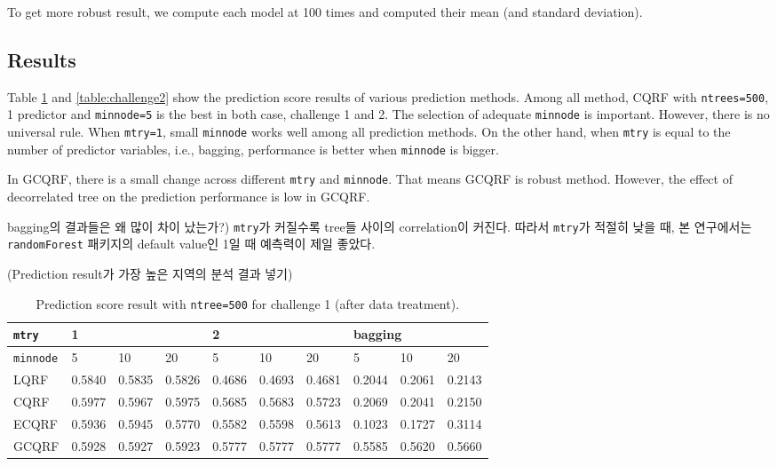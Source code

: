\documentclass[11pt,titlepage]{article}
\begin{document}
	To get more robust result, we compute each model at 100 times and computed their mean (and standard deviation). 

	\subsection{Results}
	Table \ref{table:challenge1} and \ref{table:challenge2} show the prediction score results of various prediction methods. Among all method, CQRF with \texttt{ntrees=500}, 1 predictor and  \texttt{minnode=5} is the best in both case, challenge 1 and 2. The selection of adequate \texttt{minnode} is important. However, there is no universal rule. When \texttt{mtry=1}, small \texttt{minnode} works well among all prediction methods. On the other hand, when \texttt{mtry} is equal to the number of predictor variables, i.e., bagging, performance is better when \texttt{minnode} is bigger.
	
	In GCQRF, there is a small change across different \texttt{mtry} and \texttt{minnode}. That means GCQRF is robust method. However, the effect of decorrelated tree on the prediction performance is low in GCQRF.

	bagging의 결과들은 왜 많이 차이 났는가?) \texttt{mtry}가 커질수록 tree들 사이의 correlation이 커진다. \citep{Hastie2009} 따라서 \texttt{mtry}가 적절히 낮을 때, 본 연구에서는 \texttt{randomForest} 패키지의 default value인 1일 때 예측력이 제일 좋았다.
	
	(Prediction result가 가장 높은 지역의 분석 결과 넣기)

		\begin{table}[]
		\centering
 		\begin{tabular}{|l|l|l|l|l|l|l|l|l|l|}
			\hline
			\texttt{mtry} & \multicolumn{3}{l|}{1} & \multicolumn{3}{l|}{2} & \multicolumn{3}{l|}{bagging} \\ \hline
			\texttt{minnode}          & 5       & 10      & 20      & 5       & 10      & 20      & 5       & 10      & 20      \\ \hline
			LQRF	& 0.5840	& 0.5835	& 0.5826	& 0.4686	& 0.4693	& 0.4681	& 0.2044	& 0.2061	& 0.2143\\ \hline
			CQRF   &  $\mathbf{0.5977}$       &  0.5967      &  0.5975      &  0.5685      &    0.5683     &  0.5723      &   0.2069       &   0.2041      &   0.2150     \\ \hline
			ECQRF & 0.5936       &  0.5945       &  0.5770     &  0.5582     &  0.5598      &  0.5613       &  0.1023       &  0.1727       &    0.3114     \\ \hline
			GCQRF & 0.5928        &  0.5927      &  0.5923       &   0.5777      &  0.5777       &  0.5777      &  0.5585        &  0.5620      &  0.5660       \\ \hline
		\end{tabular}
		\caption{Prediction score result with \texttt{ntree=500} for challenge 1 (after data treatment).}
		\label{table:challenge1}
	\end{table}
\end{document}

